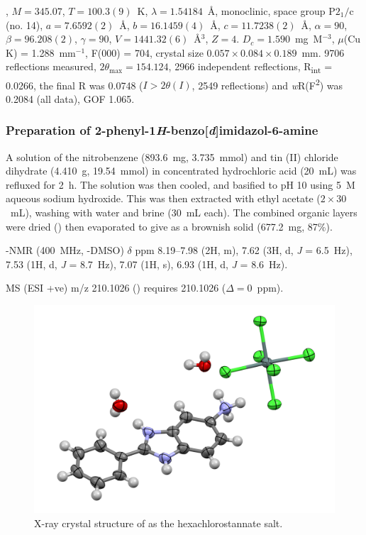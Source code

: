 \begin{refsection}
, $M=345.07$, $T=100.3(9)$~K, $\lambda=1.54184$~\AA, monoclinic, space group $\text{P}2_1/\text{c}$ (no. 14), $a = 7.6592(2)$~\AA, $b = 16.1459(4)$~\AA, $c = 11.7238(2)$~\AA, $\alpha = 90$\degree, $\beta = 96.208(2)$\degree, $\gamma = 90$\degree, $V = 1441.32(6)$~\AA$^{3}$, $Z = 4$. $D_{c}= 1.590$~mg~M$^{-3}$, $\mu$(Cu K\a) = 1.288~mm$^{-1}$, F(000) = 704, crystal size $0.057 \times 0.084 \times 0.189$~mm. 9706 reflections measured, $2\theta_{\max}=154.124$\degree, 2966 independent reflections, R\textsubscript{int} = 0.0266, the final R was 0.0748 ($I > 2\theta(I)$, 2549 reflections) and \emph{w}R(F\textsuperscript{2}) was 0.2084 (all data), GOF 1.065. 

\subsubsection[Preparation of \refcmpd{rhs-amine}]{Preparation of 2-phenyl-1\emph{H}-benzo[\emph{d}]imidazol-6-amine }
A solution of the nitrobenzene  (893.6~mg, 3.735~mmol) and tin (II) chloride dihydrate (4.410~g, 19.54~mmol) in concentrated hydrochloric acid (20~mL) was refluxed for 2~h.
The solution was then cooled, and basified to pH 10 using 5~M aqueous sodium hydroxide.
This was then extracted with ethyl acetate ($2\times30$~mL), washing with water and brine (30~mL each).
The combined organic layers were dried () then evaporated to give  as a brownish solid (677.2~mg, 87\%).\autocite{Patrick2017}

-NMR (400~MHz, -DMSO) $\delta$ ppm 8.19--7.98 (2H, m), 7.62 (3H, d, \textit{J} = 6.5~Hz), 7.53 (1H, d, \textit{J} = 8.7~Hz), 7.07 (1H, s), 6.93 (1H, d, \textit{J} = 8.6~Hz).

MS (ESI +ve) m/z 210.1026 ()  requires 210.1026 ($\Delta=0$~ppm).

\begin{figure}[ht]
    \centering
    \includegraphics[width=0.8\linewidth]{Figures/rhs-amine-xray.pdf}
    \caption{X-ray crystal structure of  as the hexachlorostannate salt.}\label{fig:rhs-amine-xray}
\end{figure}


\end{refsection}
